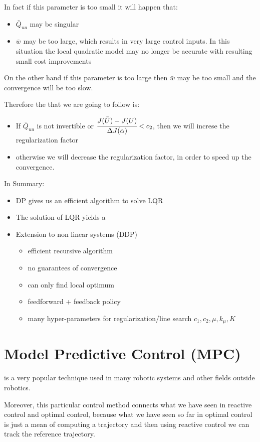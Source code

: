 In fact if this parameter is too small it will happen that:
\begin{itemize}
\item $\bar{Q}_{uu}$ may be singular
\item $\bar{w}$ may be too large, which results in very large control inputs. In this situation the local quadratic model may no longer be accurate with resulting small cost improvements
\end{itemize}
On the other hand if this parameter is too large then $\bar{w}$ may be too small and the convergence will be too slow.

Therefore the  that we are going to follow is:
\begin{itemize}
\item If $\bar{Q}_{uu}$ is not invertible or $\cfrac{J(\bar{U}) - J(U)}{\Delta J(\alpha)}<c_2$, then we will increse the regularization factor
\item otherwise we will decrease the regularization factor, in order to speed up the convergence.
\end{itemize}


In Summary:

\begin{itemize}
\item DP gives us an efficient algorithm to solve LQR
\item The solution of LQR yields a 
\item Extension to non linear systems (DDP)
\begin{itemize}
\item efficient recursive algorithm
\item no guarantees of convergence
\item can only find local optimum
\item feedforward + feedback policy
\item many hyper-parameters for regularization/line search $c_1, c_2, \mu, k_{\mu}, K$
\end{itemize}
\end{itemize}


\section{Model Predictive Control (MPC)}
 is a very popular technique used in many robotic systems and other fields outside robotics. 

Moreover, this particular control method connects what we have seen in reactive control and optimal control, because what we have seen so far in optimal control is just a mean of computing a trajectory and then using reactive control we can track the reference trajectory. 

